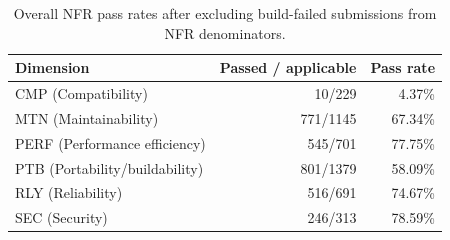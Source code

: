 \begin{table}[t]
\centering
\caption{Overall NFR pass rates after excluding build-failed submissions from NFR denominators.}
\label{tab:nfr-overall-corrected}
\begin{tabular}{lrr}
\toprule
Dimension & Passed / applicable & Pass rate \\
\midrule
CMP (Compatibility) & 10/229 & 4.37\% \\
MTN (Maintainability) & 771/1145 & 67.34\% \\
PERF (Performance efficiency) & 545/701 & 77.75\% \\
PTB (Portability/buildability) & 801/1379 & 58.09\% \\
RLY (Reliability) & 516/691 & 74.67\% \\
SEC (Security) & 246/313 & 78.59\% \\
\bottomrule
\end{tabular}
\end{table}
